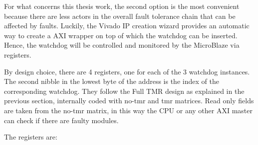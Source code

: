 For what concerns this thesis work, the second option is the most convenient because there are less actors in the overall fault tolerance chain that can be affected by faults. Luckily, the Vivado IP creation wizard provides an automatic way to create a AXI wrapper on top of which the watchdog can be inserted. Hence, the watchdog will be controlled and monitored by the MicroBlaze via registers. \bigskip

By design choice, there are 4 registers, one for each of the 3 watchdog instances. The second nibble in the lowest byte of the address is the index of the corresponding watchdog. They follow the Full TMR design as explained in the previous section, internally coded with no-tmr and tmr matrices. Read only fields are taken from the no-tmr matrix, in this way the CPU or any other AXI master can check if there are faulty modules. \bigskip

The registers are:

